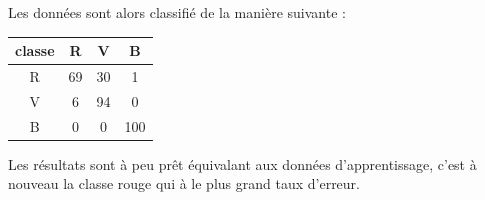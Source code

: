\documentclass[a4paper,11pt]{article}
\begin{document}
  Les données sont alors classifié de la manière suivante :
  \begin{center}
  \begin{tabular}{|c|c|c|c|}
   \hline
   classe & R & V & B\\
   \hline
   R & 69 & 30 & 1 \\
   \hline
   V & 6 & 94 & 0 \\
   \hline
   B & 0 & 0 & 100 \\
   \hline
  \end{tabular}
  \end{center}
  
  Les résultats sont à peu prêt équivalant aux données d'apprentissage, c'est à nouveau la classe rouge
  qui à le plus grand taux d'erreur.
  
  
  
\end{document}
